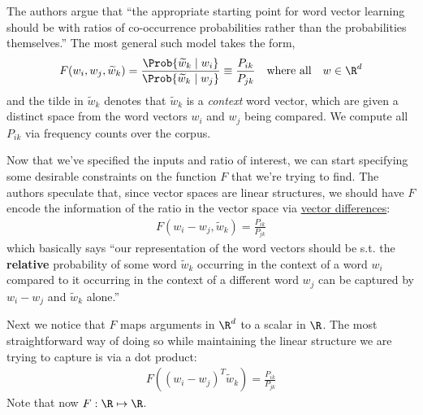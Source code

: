 \documentclass[11pt]{article}
\begin{document}
\begin{compactenum}
	\item The authors argue that ``the appropriate starting point for word vector learning should be with ratios of co-occurrence probabilities rather than the probabilities themselves.'' The most general such model takes the form,
	\begin{align}
	F(w_i, w_j, \widetilde w_k) = \frac{\Prob{\widetilde w_k \mid w_i}}{\Prob{\widetilde w_k \mid w_j}} \equiv \frac{P_{ik}}{P_{jk}} \quad \text{where all} \quad w \in \R^d
	\end{align}
	and the tilde in $\widetilde w_k$ denotes that $\widetilde w_k$ is a \textit{context} word vector, which are given a distinct space from the word vectors $w_i$ and $w_j$ being compared. We compute all $P_{ik}$ via frequency counts over the corpus. 
	
	\item Now that we've specified the inputs and ratio of interest, we can start specifying some desirable constraints on the function $F$ that we're trying to find. The authors speculate that, since vector spaces are linear structures, we should have $F$ encode the information of the ratio in the vector space via \underline{vector differences}:
	\begin{align}
		F(w_i - w_j, \widetilde w_k) = \frac{P_{ik}}{P_{jk}}
	\end{align}
	which basically says ``our representation of the word vectors should be s.t. the \textbf{relative} probability of some word $\widetilde w_k$ occurring in the context of a word $w_i$ compared to it occurring in the context of a different word $w_j$ can be captured by $w_i-w_j$ and $\widetilde w_k$ alone.''
	
	\item Next we notice that $F$ maps arguments in $\R^d$ to a scalar in $\R$. The most straightforward way of doing so while maintaining the linear structure we are trying to capture is via a dot product:
	\begin{align}
		F( (w_i - w_j)^T \widetilde w_k) = \frac{P_{ik}}{P_{jk}} \label{glove-1}
	\end{align}
	Note that now $F: \R \mapsto \R$.
	

\end{compactenum}
\end{document}
